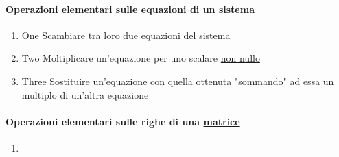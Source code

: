 \documentclass{article}
\newcommand{\ul}[1]{\underline{#1}}
\begin{document}
	\paragraph*{Operazioni elementari sulle equazioni di un \ul{sistema}}
	\begin{enumerate}[label=\Roman*.]
		\item One Scambiare tra loro due equazioni del sistema
		\item Two Moltiplicare un'equazione per uno scalare \ul{non nullo}
		\item Three Sostituire un'equazione con quella ottenuta "sommando" ad essa un multiplo di un'altra equazione
	\end{enumerate}

	\paragraph*{Operazioni elementari sulle righe di una \ul{matrice}}
	\begin{enumerate}
		\item
	\end{enumerate}
\end{document}
